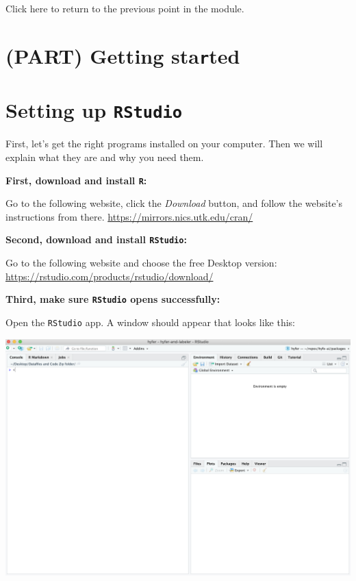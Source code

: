 \documentclass[
]{book}
\begin{document}
Click here to return to the previous point in the module.

\hypertarget{part-getting-started}{%
\chapter*{\texorpdfstring{(PART) Getting sta\texttt{r}ted}{(PART) Getting started}}\label{part-getting-started}}

\hypertarget{setting-up-rstudio}{%
\chapter{\texorpdfstring{Setting up \texttt{RStudio}}{Setting up RStudio}}\label{setting-up-rstudio}}

First, let's get the right programs installed on your computer. Then we will explain what they are and why you need them.

\textbf{First, download and install \texttt{R}: }

Go to the following website, click the \emph{Download} button, and follow the website's instructions from there.
\url{https://mirrors.nics.utk.edu/cran/}

\textbf{Second, download and install \texttt{RStudio}:}

Go to the following website and choose the free Desktop version:
\url{https://rstudio.com/products/rstudio/download/}

\textbf{Third, make sure \texttt{RStudio} opens successfully:}

Open the \texttt{RStudio} app. A window should appear that looks like this:

\includegraphics{img/rstudio_firstopen.png}
\end{document}
